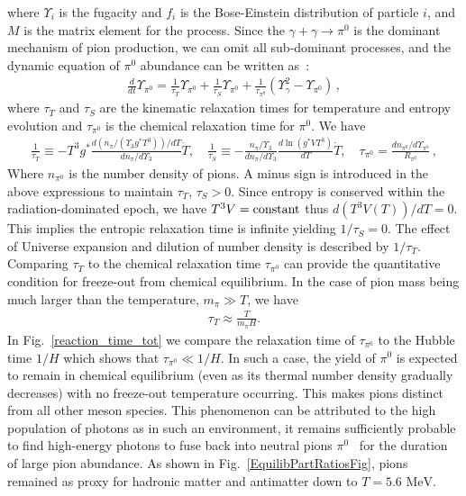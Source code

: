 \documentclass[universe,article,submit,moreauthors,pdftex,a4paper]{Definitions/mdpi}
\newcommand{\MeV}{\text{ MeV}}
\newcommand*{\rf}[1]{Fig.~{\ref{#1}}}
\newcommand*{\xblue}{\color{black}}
\begin{document}
where $\Upsilon_i$ is the fugacity and $f_{i}$ is the Bose-Einstein distribution of particle $i$, and $M$ is the matrix element for the process. Since the $\gamma+\gamma\to \pi^0$ is the dominant mechanism of pion production, we can omit all sub-dominant processes, and the dynamic equation of $\pi^0$ abundance can be written as~\cite{Fromerth:2012fe}:
\begin{align}
\frac{d}{dt}\Upsilon_{\pi^0}=\frac{1}{\tau_T}\Upsilon_{\pi^0}+\frac{1}{\tau_S}\Upsilon_{\pi^0}+\frac{1}{\tau_{\pi^0}}\left(\Upsilon^2_\gamma-\Upsilon_{\pi^0}\right)\,,
\end{align}
where $\tau_T$ and $\tau_S$ are the kinematic relaxation times for temperature and entropy evolution and $\tau_{\pi^0}$ is the chemical relaxation time for $\pi^0$. We have
\begin{align}
\frac{1}{\tau_T}\equiv -T^3g^*\frac{d (n_{\pi}/(\Upsilon_3
g^*T^3))/dT}{dn_{\pi}/d{\Upsilon_3}}{\dot T},\label{tauT} \quad
\frac{1}{\tau_{S}}\equiv
-\frac{n_{\pi}/\Upsilon_3}{dn_{\pi}/d{\Upsilon_3}}\frac{d\ln (g^*VT^3)}{dT}
\dot{T},\quad
\tau_{\pi^0}=\frac{dn_{\pi^0}/d\Upsilon_{\pi^0}}{R_{\pi^0}}\,,
\end{align}
Where $n_{\pi^0}$ is the number density of pions. A minus sign is introduced in the above expressions to maintain $\tau_T$, $\tau_S>0$. Since entropy is conserved within the radiation-dominated epoch, we have $T^{3}V={\rm constant}$ thus $d(T^3V(T))/dT=0$. This implies the entropic relaxation time is infinite yielding $1/\tau_S=0$. The effect of Universe expansion and dilution of number density is described by $1/\tau_T$. Comparing $\tau_T$ to the chemical relaxation time $\tau_{\pi^0}$ can provide the quantitative condition for freeze-out from chemical equilibrium. In the case of pion mass being much larger than the temperature, $m_{\pi}\gg T$, we have~\cite{Kuznetsova:2009xh}
\begin{align}
\tau_T\approx\frac{T}{m_{\pi}H}.
\end{align}
 In \rf{reaction_time_tot} we compare the relaxation time of $\tau_{\pi^0}$ to the Hubble time $1/H$ which shows that $\tau_{\pi^0}\ll 1/H$. In such a case, the yield of $\pi^0$ is expected to remain in chemical equilibrium (even as its thermal number density gradually decreases) with no freeze-out temperature occurring. This makes pions distinct from all other meson species. This phenomenon can be attributed to the high population of photons as in such an environment, it remains sufficiently probable to find high-energy photons to fuse back into neutral pions $\pi^0$~\cite{Fromerth:2012fe} for the duration of large pion abundance. As shown in \rf{EquilibPartRatiosFig},  {\xblue pions remained as proxy for hadronic matter and antimatter down to} $T=5.6\MeV$.
\end{document}
